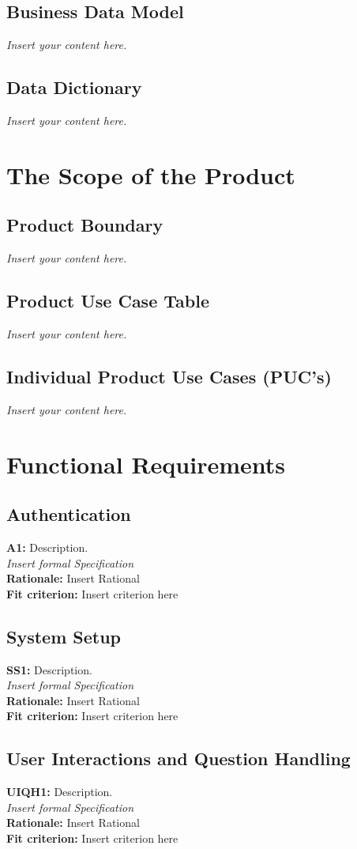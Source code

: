 \documentclass[12pt]{article}
\newcommand{\lips}{\textit{Insert your content here.}}
\begin{document}
\subsection{Business Data Model}
\lips
\subsection{Data Dictionary}
\lips

\section{The Scope of the Product}
\subsection{Product Boundary}
\lips
\subsection{Product Use Case Table}
\lips
\subsection{Individual Product Use Cases (PUC's)}
\lips

\section{Functional Requirements}

\subsection{Authentication}
\textbf{A1: } Description.\\
\textit{Insert formal Specification}\\
\textbf{Rationale: } Insert Rational\\
\textbf{Fit criterion: } Insert criterion here 

\subsection{System Setup}
\textbf{SS1: } Description.\\
\textit{Insert formal Specification}\\
\textbf{Rationale: } Insert Rational\\
\textbf{Fit criterion: } Insert criterion here 

\subsection{User Interactions and Question Handling}
\textbf{UIQH1: } Description.\\
\textit{Insert formal Specification}\\
\textbf{Rationale: } Insert Rational\\
\textbf{Fit criterion: } Insert criterion here 
\end{document}
